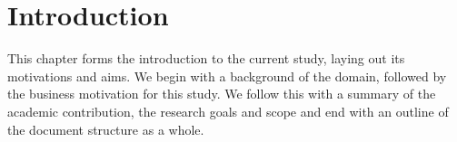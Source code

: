 %
%
%
%
\chapter{Introduction}\label{C.intro}
{This chapter forms the introduction to the current study, laying out its motivations and aims. We begin with a background of the domain, followed by the business motivation for this study. We follow this with a summary of the academic contribution, the research goals and scope and end with an outline of the document structure as a whole.  }

